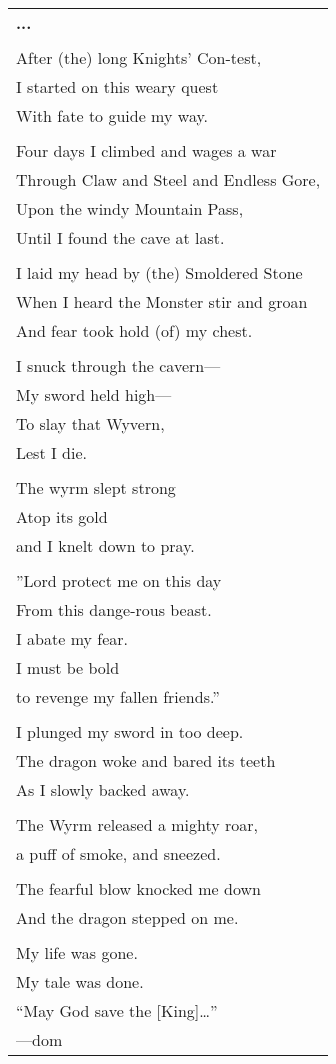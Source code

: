 \documentclass{article}
\begin{document}
\begin{center}
\begin{tabular}{l}
\textbf{...} \\
\\
After (the) long Knights' Con-test, \\
I started on this weary quest \\
With fate to guide my way. \\
\\
Four days I climbed and wages a war \\
Through Claw and Steel and Endless Gore, \\
Upon the windy Mountain Pass, \\
Until I found the cave at last. \\
\\
I laid my head by (the) Smoldered Stone \\
When I heard the Monster stir and groan \\
And fear took hold (of) my chest. \\
\\
I snuck through the cavern--- \\
My sword held high--- \\
To slay that Wyvern, \\
Lest I die. \\
\\
The wyrm slept strong \\
Atop its gold \\
and I knelt down to pray. \\
\\
''Lord protect me on this day \\
From this dange-rous beast. \\
I abate my fear. \\
I must be bold \\
to revenge my fallen friends.'' \\
\\
I plunged my sword in too deep. \\
The dragon woke and bared its teeth \\
As I slowly backed away. \\
\\
The Wyrm released a mighty roar, \\
a puff of smoke, and sneezed. \\
\\
The fearful blow knocked me down \\
And the dragon stepped on me. \\
\\
My life was gone. \\
My tale was done. \\
``May God save the [King]\ldots{}'' \\
---dom \\
\end{tabular}
\end{center}
\end{document}
